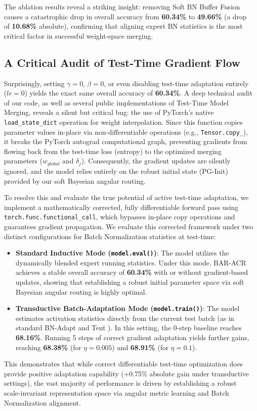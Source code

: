 \documentclass{article}
\theoremstyle{definition}
\theoremstyle{remark}
\begin{document}
The ablation results reveal a striking insight: removing Soft BN Buffer Fusion causes a catastrophic drop in overall accuracy from \textbf{60.34\%} to \textbf{49.66\%} (a drop of \textbf{10.68\%} absolute), confirming that aligning expert BN statistics is the most critical factor in successful weight-space merging.

\subsection{A Critical Audit of Test-Time Gradient Flow}
Surprisingly, setting $\gamma=0$, $\beta=0$, or even disabling test-time adaptation entirely ($lr=0$) yields the exact same overall accuracy of \textbf{60.34\%}. A deep technical audit of our code, as well as several public implementations of Test-Time Model Merging, reveals a silent but critical bug: the use of PyTorch's native \texttt{load\_state\_\allowbreak dict} operation for weight interpolation. Since this function copies parameter values in-place via non-differentiable operations (e.g., \texttt{Tensor.\allowbreak copy\_}), it breaks the PyTorch autograd computational graph, preventing gradients from flowing back from the test-time loss (entropy) to the optimized merging parameters ($w_{global}$ and $\delta_j$). Consequently, the gradient updates are silently ignored, and the model relies entirely on the robust initial state (PG-Init) provided by our soft Bayesian angular routing.

To resolve this and evaluate the true potential of active test-time adaptation, we implement a mathematically corrected, fully differentiable forward pass using \texttt{torch.func.functional\_call}, which bypasses in-place copy operations and guarantees gradient propagation. We evaluate this corrected framework under two distinct configurations for Batch Normalization statistics at test-time:
\begin{itemize}
    \item \textbf{Standard Inductive Mode (\texttt{model.eval()})}: The model utilizes the dynamically blended expert running statistics. Under this mode, BAR-ACR achieves a stable overall accuracy of \textbf{60.34\%} with or without gradient-based updates, showing that establishing a robust initial parameter space via soft Bayesian angular routing is highly optimal.
    \item \textbf{Transductive Batch-Adaptation Mode (\texttt{model.train()})}: The model estimates activation statistics directly from the current test batch (as in standard BN-Adapt and Tent \cite{wang2021_20}). In this setting, the 0-step baseline reaches \textbf{68.16\%}. Running 5 steps of correct gradient adaptation yields further gains, reaching \textbf{68.38\%} (for $\eta=0.005$) and \textbf{68.91\%} (for $\eta=0.1$).
\end{itemize}
This demonstrates that while correct differentiable test-time optimization does provide positive adaptation capability (+0.75\% absolute gain under transductive settings), the vast majority of performance is driven by establishing a robust scale-invariant representation space via angular metric learning and Batch Normalization alignment.
\end{document}
